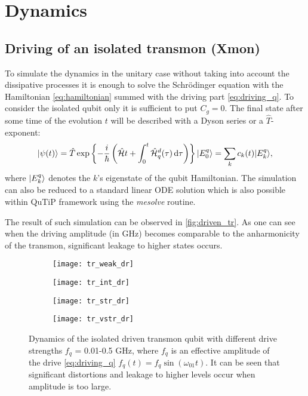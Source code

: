 \documentclass[12pt, twoside]{report}
\newcommand{\diff}{\,\mathrm{d}}
\DeclarePairedDelimiter\ket{\lvert}{\rangle}
\newcommand{\rbrkt}[1]{\left( #1 \right)}
\numberwithin{equation}{section}
\begin{document}
\section{Dynamics}

\subsection{Driving of an isolated transmon (Xmon)}

To simulate the dynamics in the unitary case without taking into account the dissipative processes it is enough to solve the Schrödinger equation with the Hamiltonian \eqref{eq:hamiltonian} summed with the driving part \eqref{eq:driving_q}. To consider the isolated qubit only it is sufficient to put $C_g = 0$. The final state after some time of the evolution $t$ will be described with a Dyson series or a $\hat T$-exponent:
\begin{equation}
\ket{\psi (t)} = \hat T \exp\left\{-\frac{i}{\hbar} \rbrkt{\mathcal{\hat H}t + \int_0^t \mathcal{\hat H}_q^d(\tau) \diff\tau}\right\} \ket{E_0^q}= \sum_k c_k(t) \ket{E^q_k},
\end{equation} 
where $\ket{E_k^q}$ denotes the $k$'s eigenstate of the qubit Hamiltonian. The simulation can also be reduced to a standard linear ODE solution which is also possible within QuTiP framework using the \textit{mesolve} routine.

The result of such simulation can be observed in \autoref{fig:driven_tr}. As one can see when the driving amplitude (in GHz) becomes comparable to the anharmonicity of the transmon, significant leakage to higher states occurs.

\begin{figure}[h!]
\centering
\begin{subfigure}[t]{0.45\textwidth}
\texttt{[image: tr\_weak\_dr]}
\end{subfigure}
\begin{subfigure}[t]{0.45\textwidth}
\texttt{[image: tr\_int\_dr]}
\end{subfigure}

\begin{subfigure}[t]{0.45\textwidth}
\texttt{[image: tr\_str\_dr]}
\end{subfigure}
\begin{subfigure}[t]{0.45\textwidth}
\texttt{[image: tr\_vstr\_dr]}
\end{subfigure}
\caption{Dynamics of the isolated driven transmon qubit with different drive strengths $f_q$ = 0.01-0.5 GHz, where $f_q$ is an effective amplitude of the drive \eqref{eq:driving_q} $f_q (t) = f_q \sin(\omega_{01} t)$. It can be seen that significant distortions and leakage to higher levels occur when amplitude is too large.}
\label{fig:driven_tr}
\end{figure}
\end{document}

